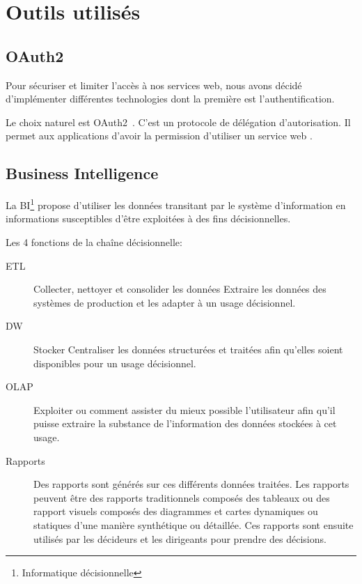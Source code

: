 \section{Outils utilisés}

\subsection{OAuth2}

Pour sécuriser et limiter l'accès à nos services web, nous avons décidé
d'implémenter différentes technologies dont la première est
l'authentification.

Le choix naturel est OAuth2~\cite{RFC6749}. C'est un protocole de délégation
d'autorisation. Il permet aux applications  d'avoir la
permission d'utiliser un service web .

\subsection{Business Intelligence}

La \acrfull{BI}\footnote{Informatique décisionnelle} propose d'utiliser les
données transitant par le système d'information en informations susceptibles
d'être exploitées à des fins décisionnelles.

Les 4 fonctions de la chaîne décisionnelle:

\begin{description}
    \item [\acrfull{ETL}] Collecter, nettoyer et consolider les données
        Extraire les données des systèmes de production et les adapter à un
        usage décisionnel.
    \item [\acrfull{DW}] Stocker Centraliser les données structurées et
        traitées afin qu'elles soient disponibles pour un usage décisionnel.
    \item [\acrfull{OLAP}] Exploiter ou comment assister du mieux possible
        l'utilisateur afin qu'il puisse extraire la substance de l'information
        des données stockées à cet usage.
    \item [Rapports] Des rapports sont générés sur ces différents données
        traitées. Les rapports peuvent être des rapports traditionnels composés
        des tableaux ou des rapport visuels composés des diagrammes et cartes
        dynamiques ou statiques d'une manière synthétique ou détaillée. Ces
        rapports sont ensuite utilisés par les décideurs et les dirigeants pour
        prendre des décisions.
\end{description}

